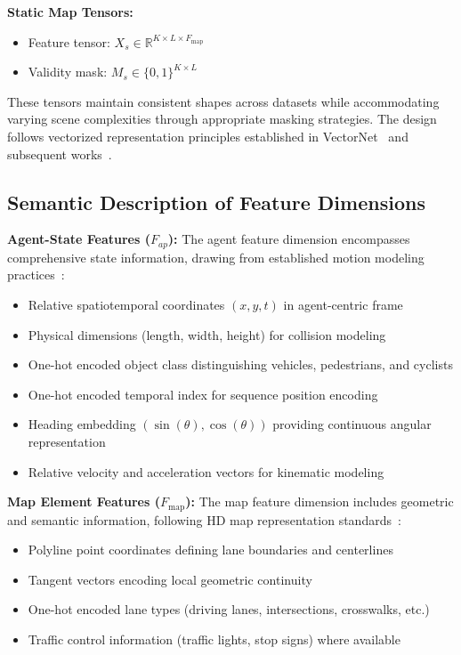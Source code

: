\textbf{Static Map Tensors:}
\begin{itemize}
    \item  Feature tensor: $X_{s} \in \mathbb{R}^{K \times L \times F_{\text{map}}}$
    \item Validity mask: $M_{s} \in \{0,1\}^{K \times L}$
\end{itemize}

These tensors maintain consistent shapes across datasets while accommodating varying scene complexities through appropriate masking strategies. The design follows vectorized representation principles established in VectorNet~\cite{gao2020vectornet} and subsequent works~\cite{liang2020learning}.


\subsection{Semantic Description of Feature Dimensions}
\label{ssec:feature_semantics}

\textbf{Agent-State Features ($F_{ap}$):} The agent feature dimension encompasses comprehensive state information, drawing from established motion modeling practices~\cite{chai2019multipath, rupprecht2017learning}:
\begin{itemize}
    \item Relative spatiotemporal coordinates $(x, y, t)$ in agent-centric frame
    \item Physical dimensions (length, width, height) for collision modeling
    \item One-hot encoded object class distinguishing vehicles, pedestrians, and cyclists
    \item One-hot encoded temporal index for sequence position encoding
    \item Heading embedding $(\sin(\theta), \cos(\theta))$ providing continuous angular representation
    \item Relative velocity and acceleration vectors for kinematic modeling
\end{itemize}

\textbf{Map Element Features ($F_{\text{map}}$):} The map feature dimension includes geometric and semantic information, following HD map representation standards~\cite{av2Wilson2023, caesar2020nuscenes}:
\begin{itemize}
    \item Polyline point coordinates defining lane boundaries and centerlines
    \item Tangent vectors encoding local geometric continuity
    \item One-hot encoded lane types (driving lanes, intersections, crosswalks, etc.)
    \item Traffic control information (traffic lights, stop signs) where available
\end{itemize}

